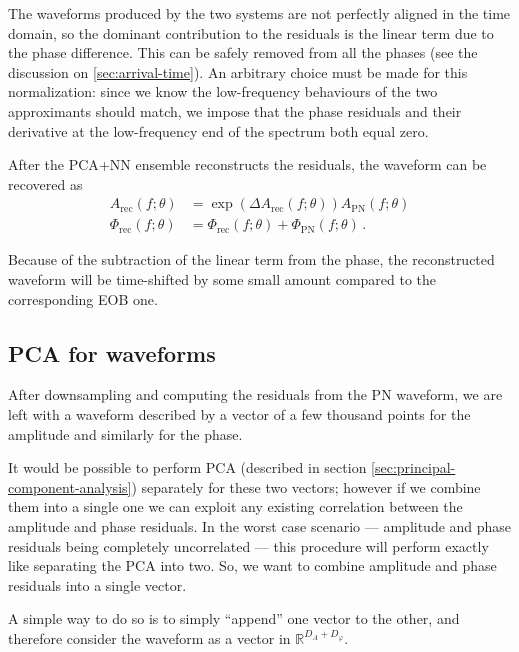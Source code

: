 \documentclass[main.tex]{subfiles}
\begin{document}
The waveforms produced by the two systems are not perfectly aligned in the time domain, so the dominant contribution to the residuals is the linear term due to the phase difference. This can be safely removed from all the phases (see the discussion on \ref{sec:arrival-time}). 
An arbitrary choice must be made for this normalization: since we know the low-frequency behaviours of the two approximants should match, we impose that the phase residuals and their derivative at the low-frequency end of the spectrum both equal zero.

After the \ac{PCA}+\ac{NN} ensemble reconstructs the residuals, the waveform can be recovered as 
%
\begin{subequations}
\begin{align}\label{eq:amplitude-phase-reconstruction}
A _{\text{rec}} (f; \theta ) &= \exp( \Delta A _{\text{rec}} (f; \theta )) A _{\text{PN}}(f; \theta )  \\
\Phi _{\text{rec}} (f; \theta ) &= \Phi _{\text{rec}}(f; \theta ) + \Phi _{\text{PN}}(f; \theta )
\,.
\end{align}
\end{subequations}

Because of the subtraction of the linear term from the phase, the reconstructed waveform will be time-shifted by some small amount compared to the corresponding \ac{EOB} one. 

\subsection{PCA for waveforms}

After downsampling and computing the residuals from the \ac{PN} waveform, we are left with a waveform described by a vector of a few thousand points for the amplitude and similarly for the phase. 

It would be possible to perform \ac{PCA} (described in section \ref{sec:principal-component-analysis}) separately for these two vectors; however if we combine them into a single one we can exploit any existing correlation between the amplitude and phase residuals. 
In the worst case scenario --- amplitude and phase residuals being completely uncorrelated --- this procedure will perform exactly like separating the \ac{PCA} into two. 
So, we want to combine amplitude and phase residuals into a single vector. 

A simple way to do so is to simply ``append'' one vector to the other, and therefore consider the waveform as a vector in \(\mathbb{R}^{D_A + D_\varphi }\). 
\end{document}

